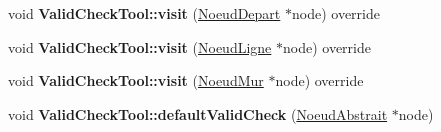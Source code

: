 \begin{DoxyCompactItemize}
\item 
\hypertarget{group__inf2990_gab3f77ff9294703aa3b3806c505421136}{}void {\bfseries Valid\+Check\+Tool\+::visit} (\hyperlink{class_noeud_depart}{Noeud\+Depart} $\ast$node) override\label{group__inf2990_gab3f77ff9294703aa3b3806c505421136}

\item 
\hypertarget{group__inf2990_gafca44465524d1775a36bc688eb03c43d}{}void {\bfseries Valid\+Check\+Tool\+::visit} (\hyperlink{class_noeud_ligne}{Noeud\+Ligne} $\ast$node) override\label{group__inf2990_gafca44465524d1775a36bc688eb03c43d}

\item 
\hypertarget{group__inf2990_gad91e261311122bc94172813602534772}{}void {\bfseries Valid\+Check\+Tool\+::visit} (\hyperlink{class_noeud_mur}{Noeud\+Mur} $\ast$node) override\label{group__inf2990_gad91e261311122bc94172813602534772}

\item 
\hypertarget{group__inf2990_ga58a361b0ca91a2b7acb338d39bc0172a}{}void {\bfseries Valid\+Check\+Tool\+::default\+Valid\+Check} (\hyperlink{class_noeud_abstrait}{Noeud\+Abstrait} $\ast$node)\label{group__inf2990_ga58a361b0ca91a2b7acb338d39bc0172a}


\end{DoxyCompactItemize}
